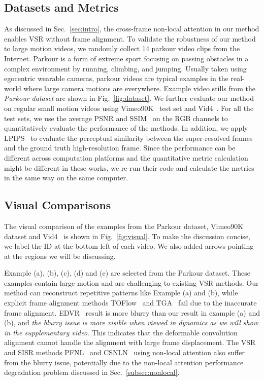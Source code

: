 \subsection{Datasets and Metrics}\label{subsec:dataset}
As discussed in Sec.~\ref{sec:intro}, the cross-frame non-local attention in our method enables VSR without frame alignment.
To validate the robustness of our method to large motion videos, we randomly collect 14 parkour video clips from the Internet.
Parkour is a form of extreme sport focusing on passing obstacles in a complex environment by running, climbing, and jumping.
Usually taken using egocentric wearable cameras, parkour videos are typical examples in the real-world where large camera motions are everywhere.
Example video stills from the \textit{Parkour dataset} are shown in Fig.~\ref{fig:dataset}.
We further evaluate our method on regular small motion videos using Vimeo90K~\cite{vimeo90k} test set and Vid4~\cite{frvsr}.
For all the test sets, we use the average PSNR and SSIM~\cite{ssim} on the RGB channels to quantitatively evaluate the performance of the methods.
In addition, we apply LPIPS~\cite{lpips} to evaluate the perceptual similarity between the super-resolved frames and the ground truth high-resolution frame.
Since the performance can be different across computation platforms and the quantitative metric calculation might be different in these works, we re-run their code and calculate the metrics in the same way on the same computer.

\subsection{Visual Comparisons}\label{subsec:visual}
The visual comparison of the examples from the Parkour dataset, Vimeo90K~\cite{vimeo90k} dataset and Vid4~\cite{frvsr} is shown in Fig.~\ref{fig:visual}.
To make the discussion concise, we label the ID at the bottom left of each video.
We also added arrows pointing at the regions we will be discussing.

Example (a), (b), (c), (d) and (e) are selected from the Parkour dataset.
These examples contain large motion and are challenging to existing VSR methods.
Our method can reconstruct repetitive patterns like Example (a) and (b), while explicit frame alignment methods TOFlow~\cite{vimeo90k} and TGA~\cite{tga} fail due to the inaccurate frame alignment.
EDVR~\cite{edvr} result is more blurry than our result in example (a) and (b), and \textit{the blurry issue is more visible when viewed in dynamics as we will show in the supplementary video}.
This indicates that the deformable convolution alignment cannot handle the alignment with large frame displacement.
The VSR and SISR methods PFNL~\cite{pfnl} and CSNLN~\cite{mei} using non-local attention also suffer from the blurry issue, potentially due to the non-local attention performance degradation problem discussed in Sec.~\ref{subsec:nonlocal}.

